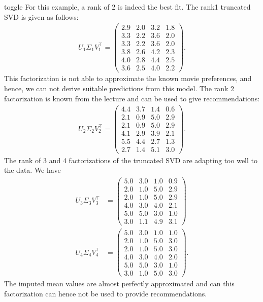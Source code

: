 \documentclass[letterpaper,10pt,english]{jupyterBook}
\begin{document}
\begin{enumerate}
\begin{sphinxuseclass}{toggle}
\sphinxAtStartPar
For this example, a rank of  2 is indeed the best fit. The rank\sphinxhyphen{}1 truncated SVD is given as follows:
\begin{align*}
      U_1\Sigma_1V_1^\top  = \begin{pmatrix}
        2.9 & 2.0 & 3.2 & 1.8\\
        3.3 & 2.2 & 3.6 & 2.0\\
        3.3 & 2.2 & 3.6 & 2.0\\
        3.8 & 2.6 & 4.2 & 2.3\\
        4.0 & 2.8 & 4.4 & 2.5\\
        3.6 & 2.5 & 4.0 & 2.2
    \end{pmatrix}.
\end{align*}
\sphinxAtStartPar
This factorization is not able to approximate the known movie preferences, and hence, we  can not derive suitable predictions from this model. The rank  2 factorization is known from the lecture and can be used to give recommendations:
\begin{align*}
     U_2\Sigma_2V_2^\top  =\begin{pmatrix}
    4.4 & 3.7 & 1.4 & 0.6\\
2.1 & 0.9 & 5.0 & 2.9\\
2.1 & 0.9 & 5.0 & 2.9\\
4.1 & 2.9 & 3.9 & 2.1\\
5.5 & 4.4 & 2.7 & 1.3\\
2.7 & 1.4 & 5.1 & 3.0
    \end{pmatrix}.
\end{align*}
\sphinxAtStartPar
The rank of 3 and 4 factorizations of the truncated SVD are adapting too well to the data. We have
\begin{align*}
         U_3\Sigma_3V_3^\top  &=\begin{pmatrix}
   5.0 & 3.0 & 1.0 & 0.9\\
2.0 & 1.0 & 5.0 & 2.9\\
2.0 & 1.0 & 5.0 & 2.9\\
4.0 & 3.0 & 4.0 & 2.1\\
5.0 & 5.0 & 3.0 & 1.0\\
3.0 & 1.1 & 4.9 & 3.1
    \end{pmatrix}\\
     U_4\Sigma_4V_4^\top  &=\begin{pmatrix}
    5.0 & 3.0 & 1.0 & 1.0\\
2.0 & 1.0 & 5.0 & 3.0\\
2.0 & 1.0 & 5.0 & 3.0\\
4.0 & 3.0 & 4.0 & 2.0\\
5.0 & 5.0 & 3.0 & 1.0\\
3.0 & 1.0 & 5.0 & 3.0
    \end{pmatrix}.
\end{align*}
\sphinxAtStartPar
The imputed mean values are almost perfectly approximated and can this factorization can hence not be used to provide recommendations.


\end{sphinxuseclass}
\end{enumerate}
\end{document}
